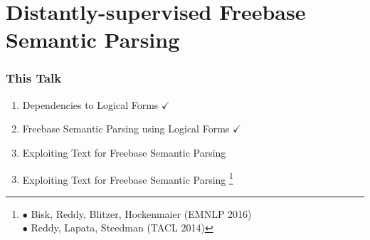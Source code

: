 \documentclass[mathserif,12pt]{beamer}
\newcommand\blfootnote[1]{%
  \begingroup
  \renewcommand\thefootnote{}\footnote{#1}%
  \addtocounter{footnote}{-1}%
  \endgroup
}
\begin{document}
\section{Distantly-supervised Freebase Semantic Parsing}

\begin{frame}
\frametitle{This Talk}
\large 
\begin{enumerate}
 \item Dependencies to Logical Forms $\checkmark$
 
 \vspace{2em}
 \item Freebase Semantic Parsing using Logical Forms $\checkmark$
 
 \vspace{2em}
 \item Exploiting Text for Freebase Semantic Parsing
\end{enumerate}
\end{frame}

\begin{frame}
\Large
\centering
\vspace{1.5em}
\begin{enumerate}
 \setcounter{enumi}{2}
 \item Exploiting Text for Freebase Semantic Parsing \blfootnote{\color{blue} 
   $\bullet$ Bisk, Reddy, Blitzer, Hockenmaier (EMNLP 2016) \\
   \hspace{1.6em} $\bullet$ Reddy, Lapata, Steedman (TACL 2014)}
\end{enumerate}
\end{frame}
\end{document}
